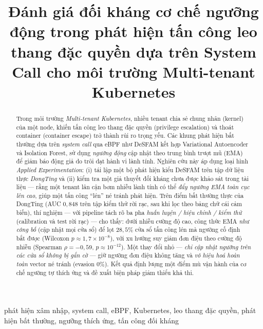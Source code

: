 \documentclass[conference,10pt]{IEEEtran}
\begin{document}
\title{Đánh giá đối kháng cơ chế ngưỡng động trong phát hiện tấn công leo thang đặc quyền dựa trên System Call cho môi trường Multi-tenant Kubernetes}

\author{
}

\maketitle

\begin{abstract}
Trong môi trường \textit{Multi-tenant Kubernetes}, nhiều tenant chia sẻ chung nhân (kernel) của một node, khiến tấn công leo thang đặc quyền (privilege escalation) và thoát container (container escape) trở thành rủi ro trọng yếu. Các khung phát hiện bất thường dựa trên \textit{system call} qua eBPF như DeSFAM kết hợp Variational Autoencoder và Isolation Forest, sử dụng \textit{ngưỡng động} cập nhật theo trung bình trượt mũ (EMA) để giảm báo động giả do trôi dạt hành vi lành tính. Nghiên cứu này áp dụng loại hình \textit{Applied Experimentation}: (i) tái lập một bộ phát hiện kiểu DeSFAM trên tập dữ liệu thực \textit{DongTing} và (ii) kiểm tra một giả thuyết đối kháng chưa được khảo sát trong tài liệu — rằng một tenant lân cận bơm nhiễu lành tính có thể \textit{đẩy ngưỡng EMA toàn cục lên cao}, giúp một tấn công ``lén'' né tránh phát hiện. Trên điểm bất thường thực của DongTing (AUC $0{,}848$ trên tập kiểm thử rời rạc, sau khi lọc theo bảng chữ cái cảm biến), thí nghiệm — với pipeline tách rõ ba pha \textit{huấn luyện / hiệu chỉnh / kiểm thử} (calibration và test rời rạc) — cho thấy: dưới nhiễu cường độ cao, công thức EMA \textit{như công bố} (cập nhật mọi cửa sổ) để lọt $28{,}5\%$ cửa sổ tấn công lén mà ngưỡng cố định bắt được (Wilcoxon $p\approx1{,}7\times10^{-8}$), với xu hướng suy giảm đơn điệu theo cường độ nhiễu (Spearman $\rho=-0{,}59$, $p\approx10^{-12}$). Một thay đổi nhỏ — \textit{chỉ cập nhật ngưỡng trên các cửa sổ không bị gắn cờ} — giữ ngưỡng đơn điệu không tăng và \textit{vô hiệu hoá hoàn toàn} vector né tránh (evasion $0\%$). Kết quả định lượng một điểm mù vận hành của cơ chế ngưỡng tự thích ứng và đề xuất biện pháp giảm thiểu khả thi.
\end{abstract}

\begin{IEEEkeywords}
phát hiện xâm nhập, system call, eBPF, Kubernetes, leo thang đặc quyền, phát hiện bất thường, ngưỡng thích ứng, tấn công đối kháng
\end{IEEEkeywords}
\end{document}
